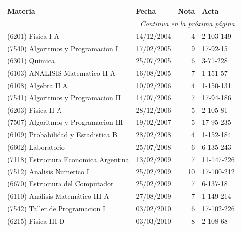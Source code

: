 \documentclass[a4paper,11pt]{article}
\begin{document}
\begin{longtable}{|l|l|r|l|}
  \hline
  Materia                                       & Fecha      & Nota & Acta              \\
  \hline
  \endhead

  \hline
  \multicolumn{4}{r}{\textit{Continua en la próxima página}} \\
  \endfoot

  \hline
  \endlastfoot


  (6201) Fisica I A                                 & 14/12/2004 & 4  & 2-103-149         \\
  (7540) Algoritmos y Programacion I                & 17/02/2005 & 9  & 17-92-15          \\
  (6301) Quimica                                    & 25/07/2005 & 6  & 3-71-228          \\
  (6103) ANALISIS Matematico II A                   & 16/08/2005 & 7  & 1-151-57          \\
  (6108) Algebra II A                               & 10/02/2006 & 4  & 1-150-131         \\
  (7541) Algoritmos y Programacion II               & 14/07/2006 & 7  & 17-94-186         \\
  (6203) Fisica II A                                & 28/12/2006 & 5  & 2-105-81          \\
  (7507) Algoritmos y Programacion III              & 19/02/2007 & 5  & 17-95-235         \\
  (6109) Probabilidad y Estadistica B               & 28/02/2008 & 4  & 1-152-184         \\
  (6602) Laboratorio                                & 25/07/2008 & 6  & 6-135-243         \\
  (7118) Estructura Economica Argentina             & 13/02/2009 & 7  & 11-147-226        \\
  (7512) Analisis Numerico I                        & 25/02/2009 & 10 & 17-100-212        \\
  (6670) Estructura del Computador                  & 25/02/2009 & 7  & 6-137-18          \\
  (6110) Análisis Matemático III A                  & 27/08/2009 & 7  & 1-149-214         \\
  (7542) Taller de Programacion I                   & 03/02/2010 & 6  & 17-102-226        \\
  (6215) Fisica III D                               & 03/03/2010 & 8  & 2-108-68          \\

\end{longtable}
\end{document}
